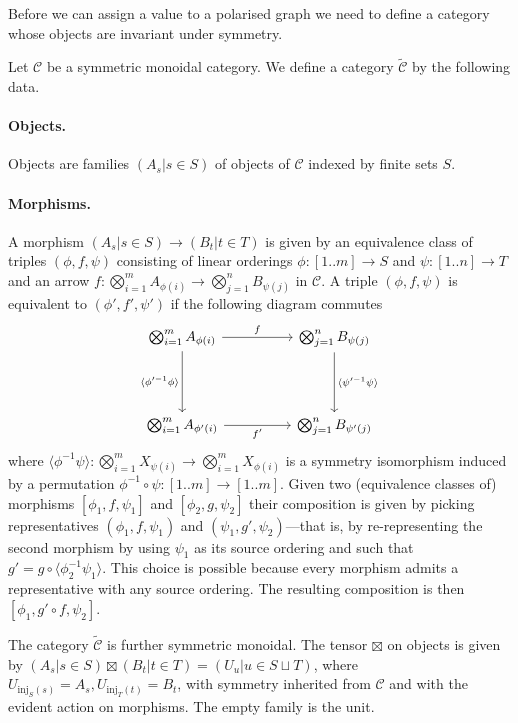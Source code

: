 Before we can assign a value to a polarised graph we need to define a category whose objects are invariant under symmetry.
\begin{definition}
    Let $\mathcal{C}$ be a symmetric monoidal category.
    We define a category $\widetilde{\mathcal{C}}$ by the following data.
    \paragraph{Objects.} Objects are families $(A_s \vert s \in S)$ of objects of $\mathcal{C}$ indexed by finite sets $S$.
    \paragraph{Morphisms.} A morphism $(A_s \vert s \in S) \to (B_t \vert t \in T)$ is given by an equivalence class of triples $(\phi, f, \psi)$ consisting of linear orderings $\phi : [1 .. m] \to S$ and $\psi : [1 .. n] \to T$ and an arrow $f : \bigotimes_{i=1}^{m} A_{\phi(i)} \to \bigotimes_{j=1}^{n} B_{\psi(j)}$ in $\mathcal{C}$.
    A triple $(\phi, f, \psi)$ is equivalent to $(\phi', f', \psi')$ if the following diagram commutes
\[\begin{tikzcd}
	{\bigotimes_{i=1}^{m}A_{\phi(i)}} && {\bigotimes_{j=1}^{n}B_{\psi(j)}} \\
	{} \\
	{\bigotimes_{i=1}^{m}A_{\phi'(i)}} && {\bigotimes_{j=1}^{n}B_{\psi'(j)}}
	\arrow["f", from=1-1, to=1-3]
	\arrow["{\langle\phi'^{-1}\phi\rangle}"', from=1-1, to=3-1]
	\arrow["{\langle \psi'^{-1}\psi\rangle}", from=1-3, to=3-3]
	\arrow["{f'}"', from=3-1, to=3-3]
\end{tikzcd}\]
where $\langle \phi^{-1}\psi \rangle : \bigotimes_{i=1}^{m} X_{\psi(i)} \to \bigotimes_{i=1}^{m} X_{\phi(i)}$ is a symmetry isomorphism induced by a permutation $\phi^{-1} \circ \psi : [1..m] \to [1..m]$.
Given two (equivalence classes of) morphisms $[\phi_1, f, \psi_1]$ and $[\phi_2, g, \psi_2]$ their composition is given by picking representatives $(\phi_1, f, \psi_1)$ and $(\psi_1, g', \psi_2)$---that is, by re-representing the second morphism by using $\psi_1$ as its source ordering and such that $g' = g \circ \langle\phi_2^{-1}\psi_1\rangle$.
This choice is possible because every morphism admits a representative with any source ordering.
The resulting composition is then $[\phi_1, g' \circ f, \psi_2]$.

The category $\tilde{\mathcal{C}}$ is further symmetric monoidal. 
The tensor $\boxtimes$ on objects is given by $(A_s \vert s \in S) \boxtimes (B_t \vert t \in T) = (U_u \vert u \in S \sqcup T)$, where $U_{\mathrm{inj}_{S}(s)} = A_s, U_{\mathrm{inj}_{T}(t)} = B_t$, with symmetry inherited from $\mathcal{C}$ and with the evident action on morphisms.
The empty family is the unit.
\end{definition}
